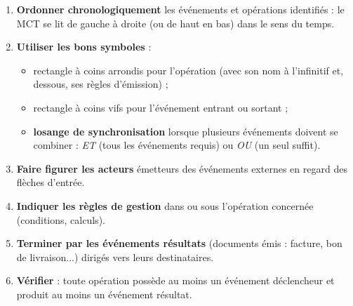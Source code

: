 \documentclass[11pt]{article}
\newcommand{\cle}[1]{{\popxbold\color{popdark}#1}}
\begin{document}
\begin{methode}
\begin{enumerate}
\item \textbf{Ordonner chronologiquement} les événements et opérations identifiés : le MCT se lit de gauche à droite (ou de haut en bas) dans le sens du temps.
\item \textbf{Utiliser les bons symboles} :
\begin{itemize}
\item rectangle à coins arrondis pour l'\cle{opération} (avec son nom à l'infinitif et, dessous, ses règles d'émission) ;
\item rectangle à coins vifs pour l'\cle{événement} entrant ou sortant ;
\item \textbf{losange de synchronisation} lorsque plusieurs événements doivent se combiner : \emph{ET} (tous les événements requis) ou \emph{OU} (un seul suffit).
\end{itemize}
\item \textbf{Faire figurer les acteurs} émetteurs des événements externes en regard des flèches d'entrée.
\item \textbf{Indiquer les règles de gestion} dans ou sous l'opération concernée (conditions, calculs).
\item \textbf{Terminer par les événements résultats} (documents émis : facture, bon de livraison...) dirigés vers leurs destinataires.
\item \textbf{Vérifier} : toute opération possède au moins un événement déclencheur et produit au moins un événement résultat.
\end{enumerate}
\end{methode}
\end{document}
